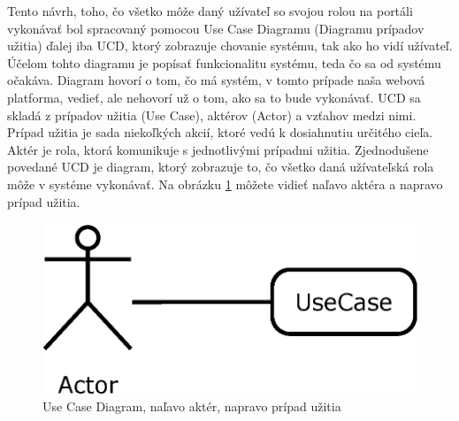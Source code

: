 Tento návrh, toho, čo všetko môže daný užívateľ so svojou rolou na portáli vykonávať bol spracovaný pomocou Use Case Diagramu (Diagramu prípadov užitia) ďalej iba UCD, ktorý zobrazuje chovanie systému, tak ako ho vidí užívateľ. Účelom tohto diagramu je popísať funkcionalitu systému, teda čo sa od systému očakáva. Diagram hovorí o tom, čo má systém, v tomto prípade naša webová platforma, vedieť, ale nehovorí už o tom, ako sa to bude vykonávať. UCD sa skladá z prípadov užitia (Use Case), aktérov (Actor) a vzťahov medzi nimi. Prípad užitia je sada niekoľkých akcií, ktoré vedú k dosiahnutiu určitého cieľa. Aktér je rola, ktorá komunikuje s jednotlivými prípadmi užitia. Zjednodušene povedané UCD je diagram, ktorý zobrazuje to, čo všetko daná užívateľská rola môže v systéme vykonávať. Na obrázku \ref{fig:ucd} môžete vidieť naľavo aktéra a napravo prípad užitia.
\begin{figure}[h]
  \centering
  \includegraphics[scale=0.43]{fig/ucd.eps}
  \caption{Use Case Diagram, naľavo aktér, napravo prípad užitia}
  \label{fig:ucd}
\end{figure}


